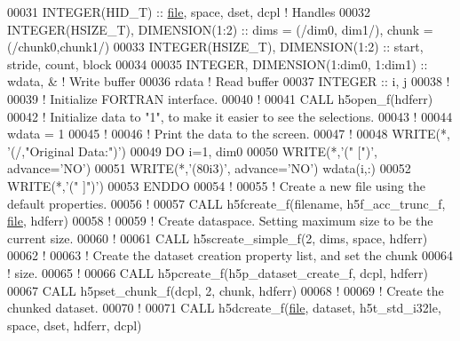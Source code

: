 \begin{DoxyCode}
00031   \textcolor{keywordtype}{INTEGER(HID\_T)}  :: \hyperlink{structfile}{file}, space, dset, dcpl \textcolor{comment}{! Handles}
00032   \textcolor{keywordtype}{INTEGER(HSIZE\_T)}, \textcolor{keywordtype}{DIMENSION(1:2)}   :: dims = (/dim0, dim1/), chunk = (/chunk0,chunk1/)
00033   \textcolor{keywordtype}{INTEGER(HSIZE\_T)}, \textcolor{keywordtype}{DIMENSION(1:2)}   :: start, stride, count, block
00034 
00035   \textcolor{keywordtype}{INTEGER}, \textcolor{keywordtype}{DIMENSION(1:dim0, 1:dim1)} :: wdata, & \textcolor{comment}{! Write buffer}
00036                                         rdata    \textcolor{comment}{! Read buffer}
00037   \textcolor{keywordtype}{INTEGER} :: i, j
00038   \textcolor{comment}{!}
00039   \textcolor{comment}{! Initialize FORTRAN interface.}
00040   \textcolor{comment}{!}
00041   \textcolor{keyword}{CALL }h5open\_f(hdferr)
00042   \textcolor{comment}{! Initialize data to "1", to make it easier to see the selections.}
00043   \textcolor{comment}{!}
00044   wdata = 1
00045   \textcolor{comment}{!}
00046   \textcolor{comment}{! Print the data to the screen.}
00047   \textcolor{comment}{!}
00048   \textcolor{keyword}{WRITE}(*, \textcolor{stringliteral}{'(/,"Original Data:")'})
00049   \textcolor{keywordflow}{DO} i=1, dim0
00050      \textcolor{keyword}{WRITE}(*,\textcolor{stringliteral}{'(" [")'}, advance=\textcolor{stringliteral}{'NO'})
00051      \textcolor{keyword}{WRITE}(*,\textcolor{stringliteral}{'(80i3)'}, advance=\textcolor{stringliteral}{'NO'}) wdata(i,:)
00052      \textcolor{keyword}{WRITE}(*,\textcolor{stringliteral}{'(" ]")'})
00053 \textcolor{keywordflow}{  ENDDO}
00054   \textcolor{comment}{!}
00055   \textcolor{comment}{! Create a new file using the default properties.}
00056   \textcolor{comment}{!}
00057   \textcolor{keyword}{CALL }h5fcreate\_f(filename, h5f\_acc\_trunc\_f, \hyperlink{structfile}{file}, hdferr)
00058   \textcolor{comment}{!}
00059   \textcolor{comment}{! Create dataspace.  Setting maximum size to be the current size.}
00060   \textcolor{comment}{!}
00061   \textcolor{keyword}{CALL }h5screate\_simple\_f(2, dims, space, hdferr)
00062   \textcolor{comment}{!}
00063   \textcolor{comment}{! Create the dataset creation property list, and set the chunk}
00064   \textcolor{comment}{! size.}
00065   \textcolor{comment}{!}
00066   \textcolor{keyword}{CALL }h5pcreate\_f(h5p\_dataset\_create\_f, dcpl, hdferr)
00067   \textcolor{keyword}{CALL }h5pset\_chunk\_f(dcpl, 2, chunk, hdferr)
00068   \textcolor{comment}{!}
00069   \textcolor{comment}{! Create the chunked dataset.}
00070   \textcolor{comment}{!}
00071   \textcolor{keyword}{CALL }h5dcreate\_f(\hyperlink{structfile}{file}, dataset, h5t\_std\_i32le, space, dset, hdferr, dcpl)

\end{DoxyCode}
